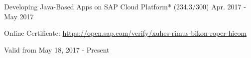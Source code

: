 \begin{cventries}
    \vspace{-0.1cm}
  \cventry
    {Developing Java-Based Apps on SAP Cloud Platform* (234.3/300)} %
    {} %
    {} %
    {Apr. 2017 - May 2017} %
    {
	    \begin{cvitems} %
        \item[] {Online Certificate: \url{https://open.sap.com/verify/xuhes-rimus-bikon-roper-hicom}} %
        \item[] {Valid from May 18, 2017 - Present} %
      \end{cvitems}
    }    
    \vspace{-0.1cm}

\end{cventries}

